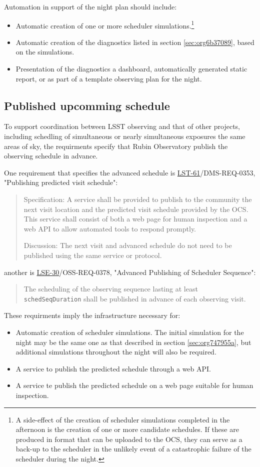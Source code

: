 Automation in support of the night plan should include:
\begin{itemize}
\item Automatic creation of one or more scheduler simulations.\footnote{A side-effect of the creation of scheduler simulations completed in the afternoon is the creation of one or more candidate schedules. If these are produced in format that can be uploaded to the OCS, they can serve as a back-up to the scheduler in the unlikely event of a catastrophic failure of the scheduler during the night.}
\item Automatic creation of the diagnostics listed in section \ref{sec:org6b37089}, based on the simulations.
\item Presentation of the diagnostics a dashboard, automatically generated static report, or as part of a template observing plan for the night.
\end{itemize}

\subsection{Published upcomming schedule}
\label{sec:orgae70e6f}
To support coordination between LSST observing and that of other projects, including schedling of simultaneous or nearly simultaneous exposures the same areas of sky, the requirments specify that Rubin Observatory publish the observing schedule in advance.

One requirement that specifies the advanced schedule is \href{https://ls.st/lse-61}{LST-61}/DMS-REQ-0353, "Publishing predicted visit schedule":
\begin{quote}
Specification: A service shall be provided to publish to the community the next visit location and the predicted visit schedule provided by the OCS. This service shall consist of both a web page for human inspection and a web API to allow automated tools to respond promptly.

Discussion: The next visit and advanced schedule do not need to be published using the same service or protocol.
\end{quote}
another is \href{https://ls.st/lse-30}{LSE-30}/OSS-REQ-0378, "Advanced Publishing of Scheduler Sequence":
\begin{quote}
The scheduling of the observing sequence lasting at least \texttt{schedSeqDuration} shall be published in advance of each observing visit.
\end{quote}

These requirments imply the infrastructure necessary for:
\begin{itemize}
\item Automatic creation of scheduler simulations. The initial simulation for the night may be the same one as that described in section \ref{sec:org747955a}, but additional simulations throughout the night will also be required.
\item A service to publish the predicted schedule through a web API.
\item A service te publish the predicted schedule on a web page suitable for human inspection.
\end{itemize}

